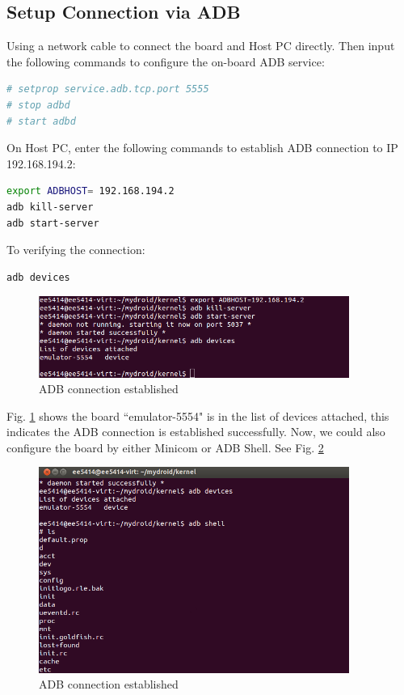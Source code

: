 \documentclass[12pt,journal,draftclsnofoot,onecolumn]{IEEEtran}
\begin{document}
    \subsection{Setup Connection via ADB}
Using a network cable to connect the board and Host PC directly. Then input the following commands to configure the on-board ADB service:
\begin{lstlisting}[language={bash}]
# setprop service.adb.tcp.port 5555
# stop adbd
# start adbd
\end{lstlisting}
On Host PC, enter the following commands to establish ADB connection to IP 192.168.194.2:
\begin{lstlisting}[language={bash}]
export ADBHOST= 192.168.194.2
adb kill-server
adb start-server
\end{lstlisting}
To verifying the connection:
\begin{lstlisting}[language={bash}]
adb devices
\end{lstlisting}
\begin{figure}[ht]
    \centering
    \includegraphics[width=4in]{./figs/lab2.png}
    \caption{ADB connection established}
    \label{lab2}
\end{figure}
Fig. \ref{lab2} shows the board ``emulator-5554" is in the list of devices attached, this indicates the ADB connection is established successfully.
Now, we could also configure the board by either Minicom or ADB Shell. See Fig. \ref{lab3}
\begin{figure}[ht]
    \centering
    \includegraphics[width=4in]{./figs/lab3.png}
    \caption{ADB connection established}
    \label{lab3}
\end{figure}
\end{document}
